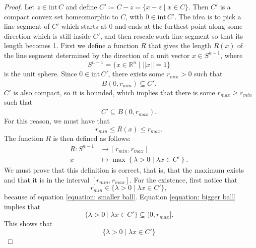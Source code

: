 \documentclass[10pt,a4paper]{amsart}
\newcommand{\interior}[1]{\mathrm{int} \, #1}
\newcommand{\realNumbers}{\mathbb{R}}
\begin{document}
\begin{proof}
	Let $z \in \interior C$ and define $C' \coloneqq C-z = \{x-z \mid x \in C\}$. Then $C'$ is a compact convex set homeomorphic to $C$, with $0 \in \interior C'$. The idea is to pick a line segment of $C'$ which starts at 0 and ends at the furthest point along some direction which is still inside $C'$, and then rescale such line segment so that its length becomes 1. First we define a function $R$ that gives the length $R(x)$ of the line segment determined by the direction of a unit vector $x \in S^{n-1}$, where
	\begin{equation}
		S^{n-1} = \{x \in \realNumbers^n \mid ||x|| = 1 \}
	\end{equation}
	is the unit sphere. Since $0 \in \interior C'$, there exists some $r_{min} > 0$ such that
	\begin{equation}
		\label{equation: smaller ball}
		\overline{B(0,r_{min})} \subseteq C'.
	\end{equation}
	$C'$ is also compact, so it is bounded, which implies that there is some $r_{max} \geq r_{min}$ such that
	\begin{equation}
		\label{equation: bigger ball}
		C' \subseteq \overline{B(0,r_{max})}.
	\end{equation}
	For this reason, we must have that
	\begin{equation}
		r_{min} \leq R(x) \leq r_{max}.
	\end{equation}
	The function $R$ is then defined as follows:
	\begin{align*}
		R \colon S^{n-1} &\longrightarrow [r_{min}, r_{max}] \\
		x &\longmapsto \max \left\{\lambda > 0 \mid \lambda x \in C' \right\}.
	\end{align*}
	We must prove that this definition is correct, that is, that the maximum exists and that it is in the interval $[r_{min}, r_{max}]$. For the existence, first notice that
	\begin{equation}
		r_{min} \in \{\lambda > 0 \mid \lambda x \in C' \},
	\end{equation}
	because of equation \ref{equation: smaller ball}. Equation \ref{equation: bigger ball} implies that
	\begin{equation}
		\{\lambda > 0 \mid \lambda x \in C' \} \subseteq (0,r_{max}].
	\end{equation}
	This shows that
	\begin{equation*}
		\{\lambda > 0 \mid \lambda x \in C' \}
	\end{equation*}

\end{proof}
\end{document}
